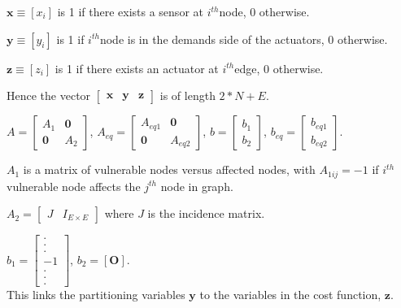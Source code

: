 \documentclass[authoryear,preprint,review,12pt]{elsarticle}
\begin{document}
$\mathbf{x}\equiv[x_{i}]$ is 1 if there exists a sensor at
$i^{th}$node, 0 otherwise.

$\mathbf{y}\equiv[y_{i}]$ is 1 if $i^{th}$node is in the demands
side of the actuators, 0 otherwise.

$\mathbf{z}\equiv[z_{i}]$ is 1 if there exists an actuator at $i^{th}$edge,
0 otherwise.

Hence the vector $\left[\mathbf{\begin{array}{ccc}
\mathbf{x} & \mathbf{y} & \mathbf{z}\end{array}}\right]$ is of length $2*N+E$. %

$A=\left[\begin{array}{cc}
A_{1} & \mathbf{0}\\
\mathbf{0} & A_{2}
\end{array}\right]$, $A_{eq}=\left[\begin{array}{cc}
A_{eq1} & \mathbf{0}\\
\mathbf{0} & A_{eq2}
\end{array}\right]$, $b=\left[\begin{array}{c}
b_{1}\\
b_{2}
\end{array}\right]$, $b_{eq}=\left[\begin{array}{c}
b_{eq1}\\
b_{eq2}
\end{array}\right]$.

$A_{1}$ is a matrix of vulnerable nodes versus affected nodes, with
$A_{1ij}=-1$ if $i^{th}$ vulnerable node affects the $j^{th}$ node
in graph.

$A_{2}=\left[\begin{array}{cc}

J & I_{E\times E}\end{array}\right]$ where $J$ is the incidence matrix.


$b_{1}=\left[\begin{array}{c}
.\\
.\\
.\\
-1\\
.\\
.\\
.
\end{array}\right]$,
$b_{2}=\left[\mathbf{O}\right]$. \\ %
This links the partitioning variables
$\mathbf{y}$ to the variables in the cost function, $\mathbf{z}$.
\end{document}
